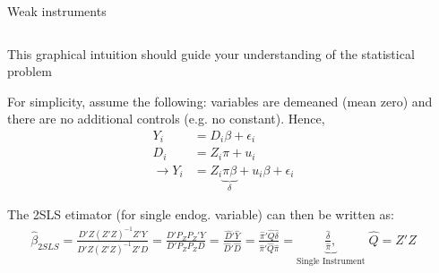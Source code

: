 \documentclass[notes,11pt, aspectratio=169]{beamer}
\newenvironment{wideitemize}{\itemize\addtolength{\itemsep}{10pt}}{\enditemize}
\begin{document}
\begin{frame}{Weak instruments}
  \begin{columns}[T] %
    \begin{column}{0.9\textwidth}
  \begin{wideitemize}
  \item This graphical intuition should guide your understanding of the statistical problem
  \item For simplicity, assume the following: variables are demeaned (mean zero) and there are no additional controls (e.g. no constant). Hence,
      \begin{align*}
        Y_{i} &= D_{i}\beta  + \epsilon_{i}\\
        D_{i} &= Z_{i}\pi  + u_{i}\\
        \rightarrow Y_{i} &= Z_{i}\underbrace{\pi\beta}_{\delta}  + u_{i}\beta + \epsilon_{i}
      \end{align*}
      \vspace{-20pt}
  \item The 2SLS etimator (for single endog. variable) can then be written as:
    \begin{align*}
      \hat{\beta}_{2SLS} = \frac{D'Z (Z'Z)^{-1}Z'Y}{D'Z (Z'Z)^{-1}Z'D} = \frac{D'P_{Z}P_{Z}'Y}{D'P_{Z}P_{Z}D} = \frac{\hat{D}'\hat{Y}}{\hat{D}'\hat{D}}  = \frac{\hat{\pi}'\hat{Q}\hat{\delta}}{\hat{\pi}'\hat{Q}\hat{\pi}} = \underbrace{\frac{\hat{\delta}}{\hat{\pi}},}_{\text{Single Instrument}}  \; \hat{Q} = Z'Z
    \end{align*}
  \item
  \item
  \end{wideitemize}
\end{column}
\begin{column}{0.5\textwidth}
\end{column}
\end{columns}
\end{frame}
\end{document}
